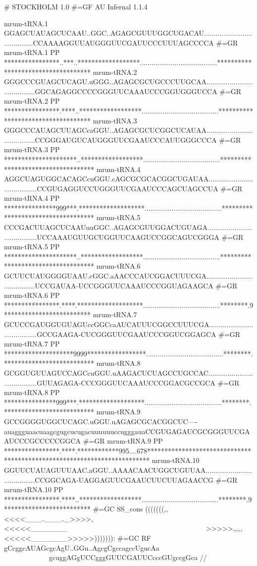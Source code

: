 \begin{tinysreoutput}
# STOCKHOLM 1.0
#=GF AU Infernal 1.1.4

mrum-tRNA.1          GGAGCUAUAGCUCAAU..GGC..AGAGCGUUUGGCUGACAU........................................CCAAAAGGUUAUGGGUUCGAUUCCCUUUAGCCCCA
#=GR mrum-tRNA.1  PP ****************..***..******************........................................***********************************
mrum-tRNA.2          GGGCCCGUAGCUCAGU.uGGG..AGAGCGCUGCCCUUGCAA........................................GGCAGAGGCCCCGGGUUCAAAUCCCGGUGGGUCCA
#=GR mrum-tRNA.2  PP ****************.****..******************........................................***********************************
mrum-tRNA.3          GGGCCCAUAGCUUAGCcaGGU..AGAGCGCUCGGCUCAUAA........................................CCGGGAUGUCAUGGGUUCGAAUCCCAUUGGGCCCA
#=GR mrum-tRNA.3  PP *********************..******************........................................***********************************
mrum-tRNA.4          AGGCUAGUGGCACAGCcuGGU.cAGCGCGCACGGCUGAUAA........................................CCGUGAGGUCCUGGGUUCGAAUCCCAGCUAGCCUA
#=GR mrum-tRNA.4  PP ***************999***.*******************........................................***********************************
mrum-tRNA.5          CCCGACUUAGCUCAAUuuGGC..AGAGCGUUGGACUGUAGA........................................UCCAAAUGUUGCUGGUUCAAGUCCGGCAGUCGGGA
#=GR mrum-tRNA.5  PP *********************..******************........................................***********************************
mrum-tRNA.6          GCUUCUAUGGGGUAAU.cGGC.aAACCCAUCGGACUUUCGA........................................UCCGAUAA-UCCGGGUUCAAAUCCCGGUAGAAGCA
#=GR mrum-tRNA.6  PP ****************.****.*******************........................................********.9*************************
mrum-tRNA.7          GCUCCGAUGGUGUAGUccGGCcaAUCAUUUCGGCCUUUCGA........................................GCCGAAGA-CUCGGGUUCGAAUCCCGGUCGGAGCA
#=GR mrum-tRNA.7  PP ********************9999*****************........................................********.**************************
mrum-tRNA.8          GCGGUGUUAGUCCAGCcuGGU.uAAGACUCUAGCCUGCCAC........................................GUUAGAGA-CCCGGGUUCAAAUCCCGGACGCCGCA
#=GR mrum-tRNA.8  PP ***************999***.*******************........................................********.**************************
mrum-tRNA.9          GCCGGGGUGGCUCAGC.uGGU.uAGAGCGCACGGCUC----auaggguaacuaagcgugcucugacuuuuuuccugggauaCCGUGAGAUCGCGGGUUCGAAUCCCGCCCCCGGCA
#=GR mrum-tRNA.9  PP ****************.****.************995....678************************************************************************
mrum-tRNA.10         GGUUCUAUAGUUUAAC.aGGU..AAAACAACUGGCUGUUAA........................................CCGGCAGA-UAGGAGUUCGAAUCUUCUUAGAACCG
#=GR mrum-tRNA.10 PP ****************.****..******************........................................********.9*************************
#=GC SS_cons         (((((((,,<<<<___..___.._>>>>,<<<<<_______~~~~~~~~~~~~~~~~~~~~~~~~~~~~~~~~~~~~~~~~>>>>>,,,,,<<<<<_______>>>>>))))))):
#=GC RF              gCcggcAUAGcgcAgU..GGu..AgcgCgccagccUgucAa~~~~~~~~~~~~~~~~~~~~~~~~~~~~~~~~~~~~~~~~gcuggAGgUCCgggGUUCGAUUCcccGUgccgGca
//
\end{tinysreoutput}


